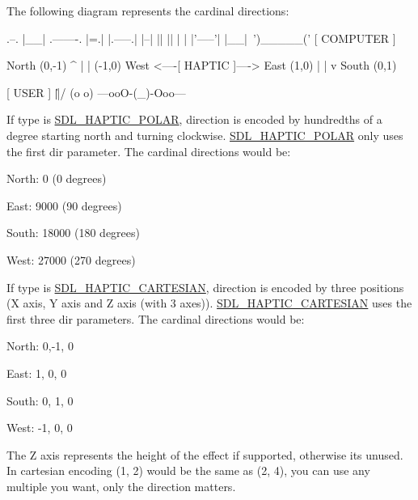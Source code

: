 The following diagram represents the cardinal directions\+: \begin{DoxyVerb}              .--.
              |__| .-------.
              |=.| |.-----.|
              |--| ||     ||
              |  | |'-----'|
              |__|~')_____('
                [ COMPUTER ]


                  North (0,-1)
                      ^
                      |
                      |
(-1,0)  West <----[ HAPTIC ]----> East (1,0)
                      |
                      |
                      v
                   South (0,1)


                   [ USER ]
                     \|||/
                     (o o)
               ---ooO-(_)-Ooo---\end{DoxyVerb}


If type is \hyperlink{SDL__haptic_8h_acdc35e97e5525472054a67b76e518f3b}{S\+D\+L\+\_\+\+H\+A\+P\+T\+I\+C\+\_\+\+P\+O\+L\+AR}, direction is encoded by hundredths of a degree starting north and turning clockwise. \hyperlink{SDL__haptic_8h_acdc35e97e5525472054a67b76e518f3b}{S\+D\+L\+\_\+\+H\+A\+P\+T\+I\+C\+\_\+\+P\+O\+L\+AR} only uses the first {\ttfamily dir} parameter. The cardinal directions would be\+:
\begin{DoxyItemize}
\item North\+: 0 (0 degrees)
\item East\+: 9000 (90 degrees)
\item South\+: 18000 (180 degrees)
\item West\+: 27000 (270 degrees)
\end{DoxyItemize}

If type is \hyperlink{SDL__haptic_8h_af8b2430a363a968de2a5b64c8f663d3b}{S\+D\+L\+\_\+\+H\+A\+P\+T\+I\+C\+\_\+\+C\+A\+R\+T\+E\+S\+I\+AN}, direction is encoded by three positions (X axis, Y axis and Z axis (with 3 axes)). \hyperlink{SDL__haptic_8h_af8b2430a363a968de2a5b64c8f663d3b}{S\+D\+L\+\_\+\+H\+A\+P\+T\+I\+C\+\_\+\+C\+A\+R\+T\+E\+S\+I\+AN} uses the first three {\ttfamily dir} parameters. The cardinal directions would be\+:
\begin{DoxyItemize}
\item North\+: 0,-\/1, 0
\item East\+: 1, 0, 0
\item South\+: 0, 1, 0
\item West\+: -\/1, 0, 0
\end{DoxyItemize}

The Z axis represents the height of the effect if supported, otherwise it\textquotesingle{}s unused. In cartesian encoding (1, 2) would be the same as (2, 4), you can use any multiple you want, only the direction matters.

